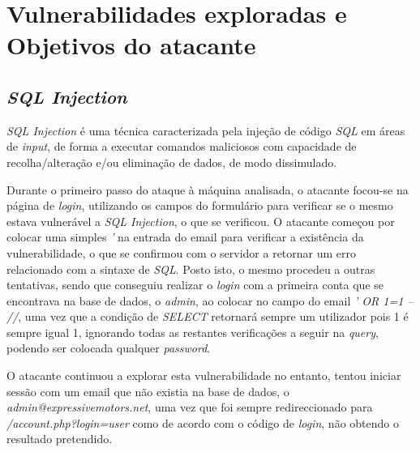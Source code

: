 \documentclass[10pt,english]{article}
\begin{document}
\clearpage


\section{Vulnerabilidades exploradas e Objetivos do atacante}

\subsection{\textit{SQL Injection}}

\par \textit{SQL Injection} é uma técnica caracterizada pela injeção de código \textit{SQL} em áreas de \textit{input}, de forma a executar comandos maliciosos com capacidade de recolha/alteração e/ou eliminação de dados, de modo dissimulado.

\par Durante o primeiro passo do ataque à máquina analisada, o atacante focou-se na página de \textit{login}, utilizando os campos do formulário para verificar se o mesmo estava vulnerável a \textit{SQL Injection}, o que se verificou. O atacante começou por colocar uma simples \textit{'} na entrada do email para verificar a existência da vulnerabilidade, o que se confirmou com o servidor a retornar um erro relacionado com a sintaxe de \textit{SQL}. Posto isto, o mesmo procedeu a outras tentativas, sendo que conseguiu realizar o \textit{login} com a primeira conta que se encontrava na base de dados, o \textit{admin}, ao colocar no campo do email \textit{' OR 1=1 -- //}, uma vez que a condição de \textit{SELECT} retornará sempre um utilizador pois 1 é sempre igual 1, ignorando todas as restantes verificações a seguir na \textit{query}, podendo ser colocada qualquer \textit{password}.

\par O atacante continuou a explorar esta vulnerabilidade no entanto, tentou iniciar sessão com um email que não existia na base de dados, o \textit{admin@expressivemotors.net}, uma vez que foi sempre redireccionado para \textit{/account.php?login=user} como de acordo com o código de \textit{login}, não obtendo o resultado pretendido.
\end{document}
